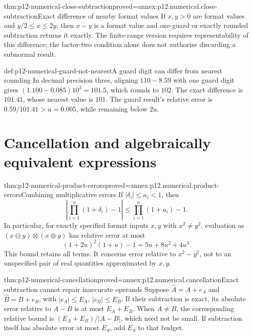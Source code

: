 \begin{hbtheorem}{thm:p12-numerical-close-subtraction}{proved=annex:p12.numerical.close-subtraction}{Exact difference of nearby format values}
If \(x,y>0\) are format values and \(y/2\leq x\leq2y\), then
\(x-y\) is a format value and one-guard or exactly rounded subtraction
returns it exactly. The finite-range version requires representability
of this difference; the factor-two condition alone does not authorize
discarding a subnormal result.
\end{hbtheorem}

\begin{hbexample}{def:p12-numerical-guard-not-nearest}{A guard digit can differ from nearest rounding}
In decimal precision three, aligning \(110-8.59\) with one guard digit
gives \((1.100-0.085)10^2=101.5\), which rounds to \(102\).
The exact difference is \(101.41\), whose nearest value is \(101\).
The guard result's relative error is \(0.59/101.41>u=0.005\),
while remaining below \(2u\).
\end{hbexample}

\section{Cancellation and algebraically equivalent expressions}

\begin{hbtheorem}{thm:p12-numerical-product-errors}{proved=annex:p12.numerical.product-errors}{Combining multiplicative errors}
If \(|\delta_i|\leq a_i<1\), then
\[
 \left|\prod_{i=1}^n(1+\delta_i)-1\right|
 \leq\prod_{i=1}^n(1+a_i)-1.
\]
In particular, for exactly specified format inputs \(x,y\) with
\(x^2\ne y^2\), evaluation as
\((x\ominus y)\otimes(x\oplus y)\) has relative error at most
\[
 (1+2u)^2(1+u)-1=5u+8u^2+4u^3.
\]
This bound retains all terms. It concerns error relative to \(x^2-y^2\),
not to an unspecified pair of real quantities approximated by \(x,y\).
\end{hbtheorem}

\begin{hbtheorem}{thm:p12-numerical-cancellation}{proved=annex:p12.numerical.cancellation}{Exact subtraction cannot repair inaccurate operands}
Suppose \(\widehat A=A+e_A\) and \(\widehat B=B+e_B\), with
\(|e_A|\leq E_A\), \(|e_B|\leq E_B\). If their subtraction is exact,
its absolute error relative to \(A-B\) is at most \(E_A+E_B\).
When \(A\ne B\), the corresponding relative bound is
\((E_A+E_B)/|A-B|\), which need not be small. If subtraction itself
has absolute error at most \(E_S\), add \(E_S\) to that budget.
\end{hbtheorem}

